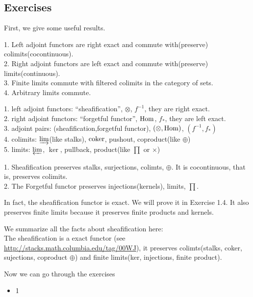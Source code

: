 \subsection*{Exercises}
First, we give some useful results.
\begin{lemma*}
	1. Left adjoint functors are right exact and commute with(preserve) colimits(cocontinuous).\\
	2. Right adjoint functors are left exact and commute with(preserve) limits(continuous).\\
	3. Finite limits commute with filtered colimits in the category of sets.\\
	4. Arbitrary limits commute.
\end{lemma*}
\begin{example}
	1. left adjoint functors: ``sheafification'', $\otimes$, $f^{-1}$, they are right exact.\\
	2. right adjoint functors: ``forgetful functor'', $\mathop{\mathrm{Hom}}$, $f_*$, they are left exact.\\
	3. adjoint pairs: (sheafification,forgetful functor), $(\otimes,\mathop{\mathrm{Hom}})$, $(f^{-1},f_*)$\\
	4. colimits: $\varinjlim$(like stalks), $\mathrm{coker}$, pushout, coproduct(like $\oplus$)\\
	5. limits: $\varprojlim$, $\ker$, pullback, product(like $\prod$ or $\times$)
\end{example}
\begin{corollary}
	1. Sheafification preserves stalks, surjections, colimts, $\oplus$. It is cocontinuous, that is, preserves colimits.\\
	2. The Forgetful functor preserves injections(kernels), limits, $\prod$.
\end{corollary}
\begin{remark*}
	In fact, the sheafification functor is exact. We will prove it in Exercise 1.4. It also preserves finite limits because it preserves finite products and kernels.

	We summarize all the facts about sheafification here:\\
   The sheafification is a exact functor (see \url{http://stacks.math.columbia.edu/tag/00WJ}), it preserves colimts(stalks, coker, sujections, coproduct $\oplus$) and finite limits(ker, injections, finite product).
\end{remark*}

Now we can go through the exercises
\begin{itemize}
	\item 1 
\end{itemize}




